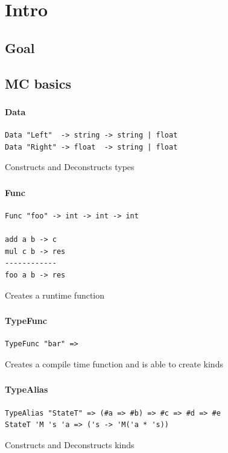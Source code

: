 \section{Intro}
\subsection{Goal}

\subsection{MC basics}

\begin{frame}[fragile]
   \frametitle{\subsecname}
   \framesubtitle{Data}

   \begin{lstlisting}
Data "Left"  -> string -> string | float
Data "Right" -> float  -> string | float
   \end{lstlisting}
   Constructs and Deconstructs types
\end{frame}

\begin{frame}[fragile]
   \frametitle{\subsecname}
   \framesubtitle{Func}

   \begin{lstlisting}
Func "foo" -> int -> int -> int

add a b -> c
mul c b -> res
------------
foo a b -> res
   \end{lstlisting}
   Creates a runtime function
\end{frame}

\begin{frame}[fragile]
   \frametitle{\subsecname}
   \framesubtitle{TypeFunc}

   \begin{lstlisting}
TypeFunc "bar" =>

   \end{lstlisting}
   Creates a compile time function and is able to create kinds
\end{frame}

\begin{frame}[fragile]
   \frametitle{\subsecname}
   \framesubtitle{TypeAlias}

   \begin{lstlisting}
TypeAlias "StateT" => (#a => #b) => #c => #d => #e
StateT 'M 's 'a => ('s -> 'M('a * 's))
   \end{lstlisting}
   Constructs and Deconstructs kinds
\end{frame}

